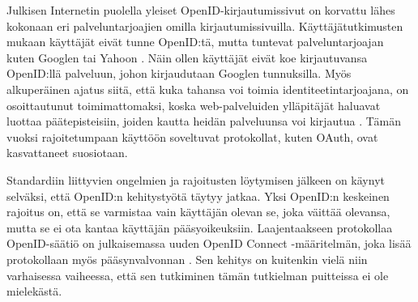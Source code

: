 Julkisen Internetin puolella yleiset OpenID-kir\-jau\-tu\-mis\-si\-vut on korvattu lähes kokonaan eri palveluntarjoajien omilla kirjautumissivuilla. Käyttäjätutkimusten mukaan käyttäjät eivät tunne OpenID:tä, mutta tuntevat palveluntarjoajan kuten Googlen tai Yahoon \cite{refuse_sso}. Näin ollen käyttäjät eivät koe kirjautuvansa OpenID:llä palveluun, johon kirjaudutaan Googlen tunnuksilla. Myös alkuperäinen ajatus siitä, että kuka tahansa voi toimia identiteetintarjoajana, on osoittautunut toimimattomaksi, koska web-palveluiden ylläpitäjät haluavat luottaa päätepisteisiin, joiden kautta heidän palveluunsa voi kirjautua \cite{refuse_sso}. Tämän vuoksi rajoitetumpaan käyttöön soveltuvat protokollat, kuten OAuth, ovat kasvattaneet suosiotaan.

Standardiin liittyvien ongelmien ja rajoitusten löytymisen jälkeen on käynyt selväksi, että \mbox{OpenID:n} kehitystyötä täytyy jatkaa. Yksi OpenID:n keskeinen rajoitus on, että se varmistaa vain käyttäjän olevan se, joka väittää olevansa, mutta se ei ota kantaa käyttäjän pääsyoikeuksiin. Laajentaakseen protokollaa OpenID-säätiö on julkaisemassa uuden OpenID Connect -määritelmän, joka lisää protokollaan myös pääsynvalvonnan \cite{distributed_web_security}. Sen kehitys on kuitenkin vielä niin varhaisessa vaiheessa, että sen tutkiminen tämän tutkielman puitteissa ei ole mielekästä.